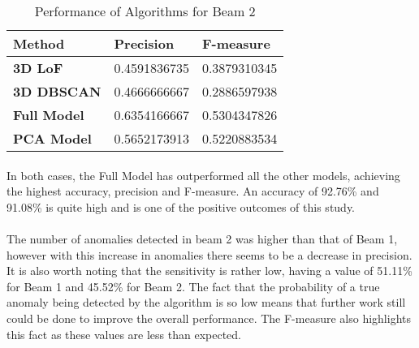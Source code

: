 \begin{table}[H]
	\centering
	\begin{tabular}{|l|l|l|}
		\hline
		\textbf{Method}     & \textbf{Precision} & \textbf{F-measure} \\ \hline
		\textbf{3D LoF}     & 0.4591836735       & 0.3879310345       \\ \hline
		\textbf{3D DBSCAN}  & 0.4666666667       & 0.2886597938       \\ \hline
		\textbf{Full Model} & 0.6354166667       & 0.5304347826       \\ \hline
		\textbf{PCA Model}  & 0.5652173913       & 0.5220883534       \\ \hline
	\end{tabular}
\caption[Beam 2 Performance Metrics]{Performance of Algorithms for Beam 2}
\label{tab::Beam2_performance}
\end{table}


\paragraph{ }In both cases, the Full Model has outperformed all the other models, achieving the highest accuracy, precision and F-measure. An accuracy of 92.76\% and 91.08\% is quite high and is one of the positive outcomes of this study.   

\paragraph{ }The number of anomalies detected in beam 2 was higher than that of Beam 1, however with this increase in anomalies there seems to be a decrease in precision. It is also worth noting that the sensitivity is rather low, having a value of 51.11\% for Beam 1 and 45.52\% for Beam 2. The fact that the probability of a true anomaly being detected by the algorithm is so low means that further work still could be done to improve the overall performance. The F-measure also highlights this fact as these values are less than expected.